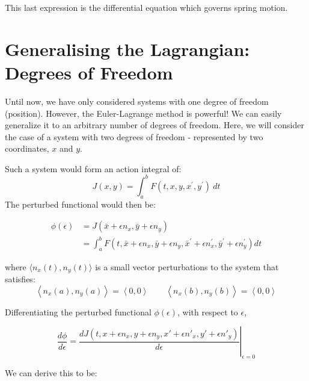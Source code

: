\documentclass[%
 amsmath,amssymb,
aps,
 fleqn,
 notitlepage,
]{revtex4-2}
\begin{document}
This last expression is the differential equation which governs spring motion.  

\section{Generalising the Lagrangian: Degrees of Freedom} %

Until now, we have only considered systems with one degree of freedom (position).  However, the Euler-Lagrange method is powerful!  We can easily generalize it to an arbitrary number of degrees of freedom.  Here, we will consider the case of a system with two degrees of freedom - represented by two coordinates, $x$ and $y$.


Such a system would form an action integral of:
\[
    J(x, y)=\int_{a}^{b} F\left(t, x, y, x^{\prime}, y^{\prime}\right) ~ dt
\]
The perturbed functional would then be:

\begin{align*}
\phi(\epsilon) &=J(\bar{x}+\epsilon n_x, \bar{y}+\epsilon n_y) \\
&=\int_{a}^{b} F\left(t, \bar{x}+\epsilon n_x, \bar{y}+\epsilon n_y, \bar{x}^{\prime}+\epsilon n_x^{\prime}, \bar{y}^{\prime}+\epsilon n_y^{\prime}\right) d t
\end{align*}

where $\langle n_x(t),n_y(t)\rangle$ is a small vector perturbations to the system that satisfies:
\[
    \left\langle n_x(a),n_y(a)\right\rangle = \left\langle 0,0 \right\rangle \qquad \left\langle n_x(b),n_y(b) \right\rangle = \left\langle 0,0 \right\rangle
\]

Differentiating the perturbed functional $\phi(\epsilon)$, with respect to $\epsilon$,

\[
    \frac{d\phi}{d\epsilon} = \left.\frac{d J(t,x+\epsilon n_x, y+\epsilon n_y,x'+\epsilon n'_x,y'+\epsilon n'_y)}{d\epsilon}\right|_{\epsilon=0}
\]

We can derive this to be:
\end{document}
